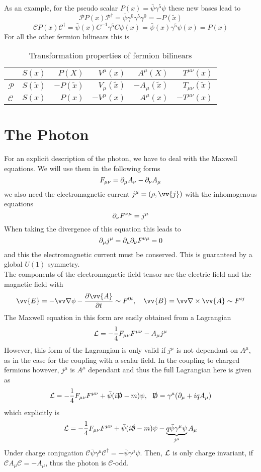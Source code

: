As an example, for the pseudo scalar $P(x) = \bar \psi \gamma^5 \psi$ these new bases lead to
\[\mathcal P P(x) \mathcal P^\dagger = \bar \psi \gamma^0 \gamma^5 \gamma^0 = - P(\tilde x)\]
\[\mathcal C P(x) \mathcal C^\dagger = \bar \psi(x) C^{-1} \gamma^5 C \psi(x) = \bar \psi(x) \gamma^5 \psi(x) = P(x)\]
For all the other fermion bilinears this is
\begin{table}[H]
\centering
\begin{tabular}{l|rrrrr}
&$S(x)$&$P(X)$&$V^\mu(x)$&$A^\mu(X)$&$T^{\mu\nu}(x)$\\
\midrule
$\mathcal P$ & $S(\tilde x)$ & $-P(\tilde x)$ & $V_\mu(\tilde x)$&$-A_\mu(\tilde x)$&$ T_{\mu\nu}(\tilde x)$\\
$\mathcal C$&$ S(x) $&$ P(x) $&$ - V^\mu(x) $&$ A^\mu(x) $&$ - T^{\mu\nu}(x) $\\
\end{tabular}
\caption{Transformation properties of fermion bilinears}
\end{table}



\section{The Photon}
For an explicit description of the photon, we have to deal with the Maxwell equations.
We will use them in the following forms
\[ F_{\mu\nu} = \partial_\mu A_\nu - \partial_\nu A_\mu\]
we also need the electromagnetic current $j^\mu = ( \rho, \vv{j})$ with the inhomogenous equations
\[ \partial_\nu F^{\nu\mu} = j ^\mu\]
When taking the divergence of this equation this leads to
\[ \partial_\mu j^\mu = \partial_\mu \partial_\nu F^{\nu\mu} = 0\]
and this the electromagnetic current must be conserved. This is guaranteed by a global $U(1)$ symmetry.\\
The components of the electromagnetic field tensor are the electric field and the magnetic field with
\[ \vv{E} = - \vn \phi - \frac{\p \vv{A}}{\p t} \sim F^{0i}, ~~~ \vv{B} = \vn \times \vv{A} \sim F^{ij}\]
The Maxwell equation in this form are easily obtained from a Lagrangian
\[ \mathcal{L} = -\frac{1}{4} F_{\mu\nu}F^{\mu\nu} - A_\mu j^\mu\]
However, this form of the Lagrangian is only valid if $j^\mu$ is not dependant on $A^\mu$, as in the case for the coupling with a scalar field. 
In the coupling to charged fermions however, $j^\mu$ is $A^\mu$ dependant and thus the full Lagrangian here is given as
\[ \LL = - \frac{1}{4} F_{\mu\nu}F^{\mu\nu} + \bar \psi ( i \slashed \Dd - m) \psi, ~~ \slashed \Dd = \gamma^\mu( \p_\mu + i q A_\mu)\]
which explicitly is
\[ \LL = - \frac{1}{4} F_{\mu\nu}F^{\mu\nu} + \bar \psi( i \slashed \p - m) \psi - \underbrace{q \bar \psi \gamma^\mu \psi}_{j^\mu}A_\mu\]
Under charge conjugation $\mathcal{C} \bar \psi \gamma^\mu \mathcal{C}^\dagger = - \bar \psi \gamma^\mu \psi$.
Then, $\mathcal{L}$ is only charge invariant, if $\mathcal C A_\mu \mathcal C = - A_\mu$, thus the photon is $\mathcal C$-odd.
